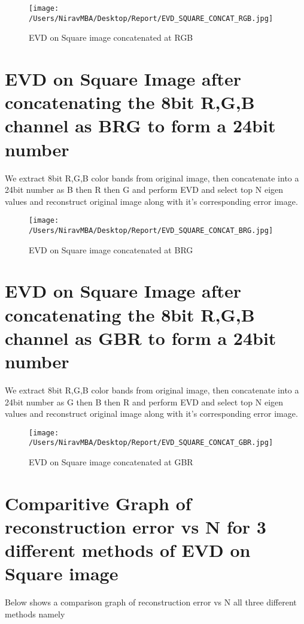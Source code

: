 \documentclass[12pt]{report}
\begin{document}
\begin{figure}[H]
	
	\texttt{[image: /Users/NiravMBA/Desktop/Report/EVD\_SQUARE\_CONCAT\_RGB.jpg]}
	\caption{EVD on Square image concatenated at RGB}
\end{figure}
\cleardoublepage
\section{EVD on Square Image after concatenating the 8bit R,G,B channel as BRG to form a 24bit number }
We extract 8bit R,G,B color bands from original image, then concatenate into a 24bit number as B then R then G and perform EVD and select top N eigen values and reconstruct original image along with it's corresponding error image.\\

\begin{figure}[H]
	
	\texttt{[image: /Users/NiravMBA/Desktop/Report/EVD\_SQUARE\_CONCAT\_BRG.jpg]}
	\caption{EVD on Square image concatenated at BRG}
\end{figure}

\cleardoublepage
\section{EVD on Square Image after concatenating the 8bit R,G,B channel as GBR to form a 24bit number }

We extract 8bit R,G,B color bands from original image, then concatenate into a 24bit number as G then B then R and perform EVD and select top N eigen values and reconstruct original image along with it's corresponding error image.\\

\begin{figure}[H]
	
	\texttt{[image: /Users/NiravMBA/Desktop/Report/EVD\_SQUARE\_CONCAT\_GBR.jpg]}
	\caption{EVD on Square image concatenated at GBR}
\end{figure}
\cleardoublepage

\section{Comparitive Graph of reconstruction error vs N for 3 different methods of EVD on Square image }
Below shows a comparison graph of reconstruction error vs N all three different methods namely \\  
\end{document}
